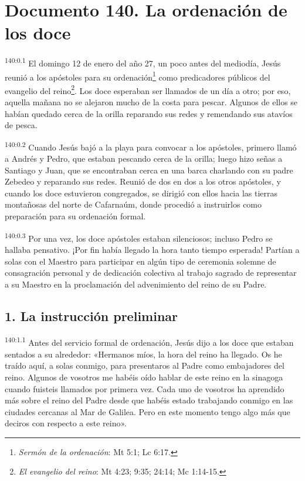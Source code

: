 \chapter{Documento 140. La ordenación de los doce}
\par
\textsuperscript{140:0.1} El domingo 12 de enero del año 27, un poco antes del mediodía, Jesús reunió a los apóstoles para su ordenación\footnote{\textit{Sermón de la ordenación}: Mt 5:1; Lc 6:17.} como predicadores públicos del evangelio del reino\footnote{\textit{El evangelio del reino}: Mt 4:23; 9:35; 24:14; Mc 1:14-15.}. Los doce esperaban ser llamados de un día a otro; por eso, aquella mañana no se alejaron mucho de la costa para pescar. Algunos de ellos se habían quedado cerca de la orilla reparando sus redes y remendando sus atavíos de pesca.

\par
\textsuperscript{140:0.2} Cuando Jesús bajó a la playa para convocar a los apóstoles, primero llamó a Andrés y Pedro, que estaban pescando cerca de la orilla; luego hizo señas a Santiago y Juan, que se encontraban cerca en una barca charlando con su padre Zebedeo y reparando sus redes. Reunió de dos en dos a los otros apóstoles, y cuando los doce estuvieron congregados, se dirigió con ellos hacia las tierras montañosas del norte de Cafarnaúm, donde procedió a instruirlos como preparación para su ordenación formal.

\par
\textsuperscript{140:0.3} Por una vez, los doce apóstoles estaban silenciosos; incluso Pedro se hallaba pensativo. ¡Por fin había llegado la hora tanto tiempo esperada! Partían a solas con el Maestro para participar en algún tipo de ceremonia solemne de consagración personal y de dedicación colectiva al trabajo sagrado de representar a su Maestro en la proclamación del advenimiento del reino de su Padre.

\section*{1. La instrucción preliminar}
\par
\textsuperscript{140:1.1} Antes del servicio formal de ordenación, Jesús dijo a los doce que estaban sentados a su alrededor: «Hermanos míos, la hora del reino ha llegado. Os he traído aquí, a solas conmigo, para presentaros al Padre como embajadores del reino. Algunos de vosotros me habéis oído hablar de este reino en la sinagoga cuando fuisteis llamados por primera vez. Cada uno de vosotros ha aprendido más sobre el reino del Padre desde que habéis estado trabajando conmigo en las ciudades cercanas al Mar de Galilea. Pero en este momento tengo algo más que deciros con respecto a este reino».

